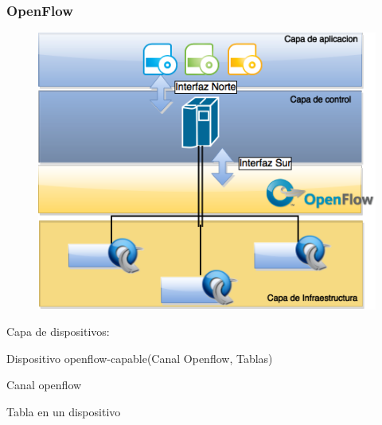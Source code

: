\documentclass{beamer}
\begin{document}
\begin{frame}
\frametitle{OpenFlow} 
\begin{minipage}{0.60\textwidth}
	\begin{figure}[H]
		\raggedright
		\includegraphics[width=1.0\textwidth, right]{imagenes/openflowFull.png}
	\end{figure}
	

\end{minipage}

\begin{minipage}{0.49\textwidth}
Capa de dispositivos:

Dispositivo openflow-capable(Canal Openflow, Tablas)

Canal openflow

Tabla en un dispositivo


	

\end{minipage}



\end{frame}
\end{document}
